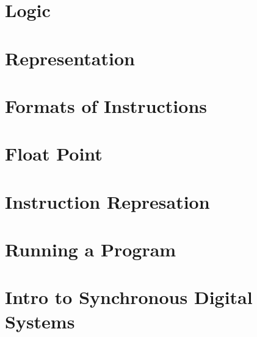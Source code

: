 \documentclass[en,11pt,english,black,simple,device=ppt]{elegantbook}
\begin{document}


\section{Logic}



\section{Representation}



\section{Formats of Instructions}



\section{Float Point}







\section{Instruction Represation}



\section{Running a Program}






\section{Intro to Synchronous Digital Systems}


\end{document}

